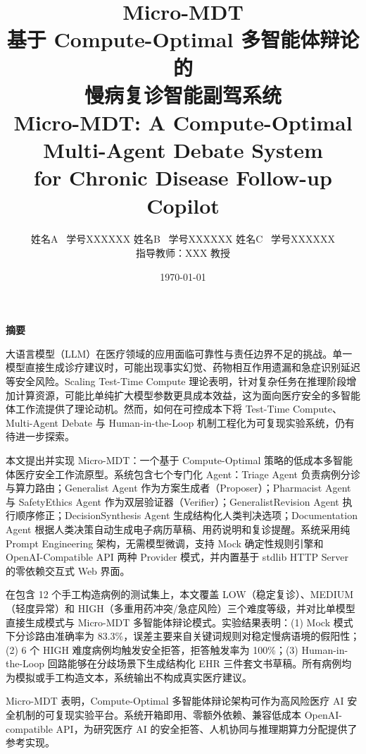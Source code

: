 \documentclass[11pt,a4paper]{ctexart}
\title{{\Huge \textbf{Micro-MDT}}\\[6pt]
       {\Large 基于 Compute-Optimal 多智能体辩论的}\\[4pt]
       {\Large 慢病复诊智能副驾系统}\\[12pt]
       {\normalsize Micro-MDT: A Compute-Optimal Multi-Agent Debate System}\\[4pt]
       {\normalsize for Chronic Disease Follow-up Copilot}}
\author{姓名A \ 学号XXXXXX \quad 姓名B \ 学号XXXXXX \quad 姓名C \ 学号XXXXXX \\[4pt]
        \small 指导教师：XXX 教授}
\date{\today}
\begin{document}
\maketitle
\thispagestyle{empty}

\newpage
\setcounter{page}{1}

\begin{center}
    {\large \textbf{摘\quad 要}}
\end{center}

 大语言模型（LLM）在医疗领域的应用面临可靠性与责任边界不足的挑战。单一模型直接生成诊疗建议时，可能出现事实幻觉、药物相互作用遗漏和急症识别延迟等安全风险。Scaling Test-Time Compute 理论表明，针对复杂任务在推理阶段增加计算资源，可能比单纯扩大模型参数更具成本效益，这为面向医疗安全的多智能体工作流提供了理论动机。然而，如何在可控成本下将 Test-Time Compute、Multi-Agent Debate 与 Human-in-the-Loop 机制工程化为可复现实验系统，仍有待进一步探索。

 本文提出并实现 Micro-MDT：一个基于 Compute-Optimal 策略的低成本多智能体医疗安全工作流原型。系统包含七个专门化 Agent：Triage Agent 负责病例分诊与算力路由；Generalist Agent 作为方案生成者（Proposer）；Pharmacist Agent 与 SafetyEthics Agent 作为双层验证器（Verifier）；GeneralistRevision Agent 执行顺序修正；DecisionSynthesis Agent 生成结构化人类判决选项；Documentation Agent 根据人类决策自动生成电子病历草稿、用药说明和复诊提醒。系统采用纯 Prompt Engineering 架构，无需模型微调，支持 Mock 确定性规则引擎和 OpenAI-Compatible API 两种 Provider 模式，并内置基于 stdlib HTTP Server 的零依赖交互式 Web 界面。

 在包含 12 个手工构造病例的测试集上，本文覆盖 LOW（稳定复诊）、MEDIUM（轻度异常）和 HIGH（多重用药冲突/急症风险）三个难度等级，并对比单模型直接生成模式与 Micro-MDT 多智能体辩论模式。实验结果表明：(1) Mock 模式下分诊路由准确率为 83.3\%，误差主要来自关键词规则对稳定慢病语境的假阳性；(2) 6 个 HIGH 难度病例均触发安全拒答，拒答触发率为 100\%；(3) Human-in-the-Loop 回路能够在分歧场景下生成结构化 EHR 三件套文书草稿。所有病例均为模拟或手工构造文本，系统输出不构成真实医疗建议。

 Micro-MDT 表明，Compute-Optimal 多智能体辩论架构可作为高风险医疗 AI 安全机制的可复现实验平台。系统开箱即用、零额外依赖、兼容低成本 OpenAI-compatible API，为研究医疗 AI 的安全拒答、人机协同与推理期算力分配提供了参考实现。
\end{document}
